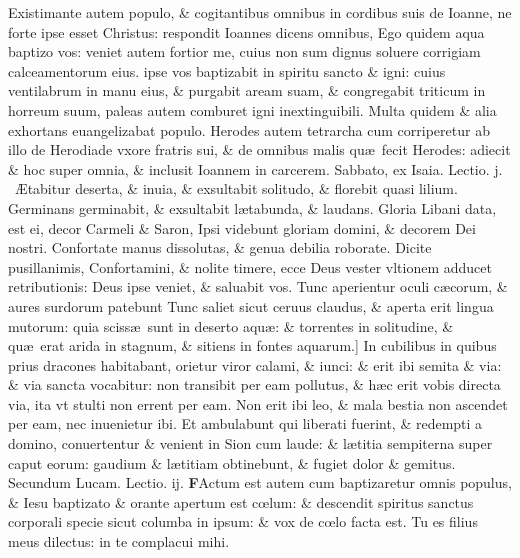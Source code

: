 \documentclass[a5paper,10pt]{book}
\def\ae{æ}
\def\AE{Æ}
\def\oe{œ}
\begin{document}
\begin{multicols*}{2}
Existimante autem populo, \& cogitantibus omnibus in cordibus suis de Ioanne, ne forte ipse esset Christus: respondit Ioannes dicens omnibus, Ego quidem aqua baptizo vos: veniet autem fortior me,
cuius non sum dignus soluere corrigiam calceamentorum eius. ipse vos baptizabit in spiritu sancto \& igni: cuius ventilabrum in manu eius, \& purgabit aream suam, \& congregabit triticum in horreum suum, paleas autem comburet igni inextinguibili.
Multa quidem \& alia exhortans euangelizabat populo.
Herodes autem tetrarcha cum corriperetur ab illo de Herodiade vxore fratris sui, \& de omnibus malis qu\ae \ fecit Herodes: adiecit \& hoc super omnia, \& inclusit Ioannem in carcerem.
\newline {} \color{red} \hypertarget{SUN-SECUNDA-ADV}{Sabbato,} ex Isaia. \hfill Lectio. j. \color{black}
\vspace{-.25em}
\textdagger \ \AE tabitur deserta, \& inuia, \& exsultabit solitudo, \& florebit quasi lilium.
Germinans germinabit, \& exsultabit l\ae tabunda, \& laudans.
Gloria Libani data, est ei, decor Carmeli \& Saron, Ipsi videbunt gloriam domini, \& decorem Dei nostri.
Confortate manus dissolutas, \& genua debilia roborate.
Dicite pusillanimis, Confortamini, \& nolite timere, ecce Deus vester vltionem adducet retributionis: Deus ipse veniet, \& saluabit vos.
Tunc aperientur oculi c\ae corum, \& aures surdorum patebunt
Tunc saliet sicut ceruus claudus, \& aperta erit lingua mutorum: quia sciss\ae \ sunt in deserto aqu\ae : \& torrentes in solitudine, \& qu\ae \ erat arida in stagnum, \& sitiens in fontes aquarum.]
In cubilibus in quibus prius dracones habitabant, orietur viror calami, \& iunci: \& erit ibi semita \& via: \& via sancta vocabitur: non transibit per eam pollutus, \& h\ae c erit vobis directa via, ita vt stulti non errent per eam.
Non erit ibi leo, \& mala bestia non ascendet per eam, nec inuenietur ibi.
Et ambulabunt qui liberati fuerint, \& redempti a domino, conuertentur \& venient in Sion cum laude: \& l\ae titia sempiterna super caput eorum: gaudium \& l\ae titiam obtinebunt, \& fugiet dolor \& gemitus.
\newline \color{red} Secundum Lucam. \hfill Lectio. ij. \color{black}
\vspace{-.25em}
\lettrine[lines=2]{\bfseries \color{red} F}{}Actum est autem cum baptizaretur omnis populus, \& Iesu baptizato \& orante apertum est c\oe lum: \& descendit spiritus sanctus corporali specie sicut columba in ipsum: \& vox de c\oe lo facta est.
Tu es filius meus dilectus: in te complacui mihi.

\end{multicols*}
\end{document}

